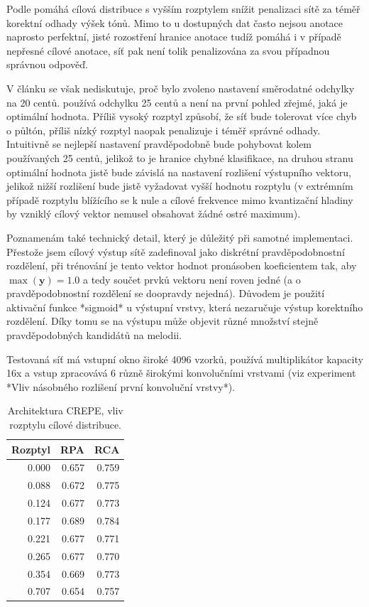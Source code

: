 Podle \cite{Bittner2017} pomáhá cílová distribuce s vyšším rozptylem snížit penalizaci sítě za téměř korektní odhady výšek tónů. Mimo to u dostupných dat často nejsou anotace naprosto perfektní, jisté rozostření hranice anotace tudíž pomáhá i v případě nepřesné cílové anotace, síť pak není tolik penalizována za svou případnou správnou odpověď. 

V článku se však nediskutuje, proč bylo zvoleno nastavení směrodatné odchylky na 20 centů. \cite{Kim2018} používá odchylku 25 centů a není na první pohled zřejmé, jaká je optimální hodnota. Příliš vysoký rozptyl způsobí, že síť bude tolerovat více chyb o půltón, příliš nízký rozptyl naopak penalizuje i téměř správné odhady. Intuitivně se nejlepší nastavení pravděpodobně bude pohybovat kolem používaných 25 centů, jelikož to je hranice chybné klasifikace, na druhou stranu optimální hodnota jistě bude závislá na nastavení rozlišení výstupního vektoru, jelikož nižší rozlišení bude jistě vyžadovat vyšší hodnotu rozptylu (v extrémním případě rozptylu blížícího se k nule a cílové frekvence mimo kvantizační hladiny by vzniklý cílový vektor nemusel obsahovat žádné ostré maximum).

Poznamenám také technický detail, který je důležitý při samotné implementaci. Přestože jsem cílový výstup sítě zadefinoval jako diskrétní pravděpodobnostní rozdělení, při trénování je tento vektor hodnot pronásoben koeficientem tak, aby $\max(\mathbf{y}) = 1.0$ a tedy součet prvků vektoru není roven jedné (a o pravděpodobnostní rozdělení se doopravdy nejedná). Důvodem je použití aktivační funkce *sigmoid* u výstupní vrstvy, která nezaručuje výstup korektního rozdělení. Díky tomu se na výstupu může objevit různé množství stejně pravděpodobných kandidátů na melodii.

Testovaná síť má vstupní okno široké 4096 vzorků, používá multiplikátor kapacity 16x a vstup zpracovává 6 různě širokými konvolučními vrstvami (viz experiment *Vliv násobného rozlišení první konvoluční vrstvy*).


\begin{table}[h!]
\centering
    \begin{tabular}{rrr}
    \toprule
    Rozptyl &   RPA &   RCA \\
    \midrule
    0.000 & 0.657 & 0.759 \\
    0.088 & 0.672 & 0.775 \\
    0.124 & 0.677 & 0.773 \\
    0.177 & 0.689 & 0.784 \\
    0.221 & 0.677 & 0.771 \\
    0.265 & 0.677 & 0.770 \\
    0.354 & 0.669 & 0.773 \\
    0.707 & 0.654 & 0.757 \\
    \bottomrule
    \end{tabular}

\caption{Architektura CREPE, vliv rozptylu cílové distribuce.}\label{tab:crepe_diskretizace}
\end{table}

